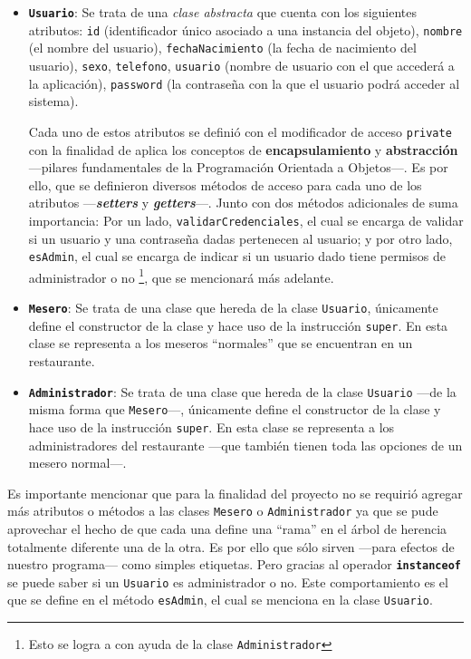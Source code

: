 \begin{itemize}
  \item \textbf{\texttt{Usuario}}: Se trata de una \textit{clase abstracta} 
  que cuenta con los siguientes atributos: \texttt{id} (identificador único 
    asociado a una instancia del objeto), \texttt{nombre} (el nombre del  
    usuario), \texttt{fechaNacimiento} (la fecha de nacimiento del usuario), 
    \texttt{sexo}, \texttt{telefono}, \texttt{usuario} (nombre de usuario con 
    el que accederá a la aplicación), \texttt{password} (la contraseña con la 
    que el usuario podrá acceder al sistema).

  Cada uno de estos atributos se definió con el modificador de acceso 
  \texttt{private} con la finalidad de aplica los conceptos de 
    \textbf{encapsulamiento} y \textbf{abstracción} ---pilares fundamentales 
    de la Programación Orientada a Objetos---. Es por ello, que se definieron 
    diversos métodos de acceso para cada uno de los atributos 
    ---\textbf{\textit{setters}} y \textbf{\textit{getters}}---. Junto con dos 
    métodos adicionales de suma importancia: Por un lado,  
    \texttt{validarCredenciales}, el cual se encarga de validar si un usuario  
    y una contraseña dadas pertenecen al usuario; y por otro lado, 
    \texttt{esAdmin}, el cual se encarga de indicar si un usuario dado tiene 
    permisos de administrador o no \footnote{Esto se logra a con ayuda de la 
    clase \texttt{Administrador}}, que se mencionará más adelante.

  \item \textbf{\texttt{Mesero}}: Se trata de una clase que hereda de la clase 
    \texttt{Usuario}, únicamente define el constructor de la clase y hace uso 
    de la instrucción \texttt{super}. En esta clase se representa a los 
    meseros ``normales'' que se encuentran en un restaurante.

  \item \textbf{\texttt{Administrador}}: Se trata de una clase que hereda de la clase 
    \texttt{Usuario} ---de la misma forma que \texttt{Mesero}---, únicamente 
    define el constructor de la clase y hace uso de la instrucción 
    \texttt{super}. En esta clase se representa a los administradores del 
    restaurante ---que también tienen toda las opciones de un mesero 
    normal---.
\end{itemize}

Es importante mencionar que para la finalidad del proyecto no se requirió 
agregar más atributos o métodos a las clases \texttt{Mesero} o 
\texttt{Administrador} ya que se pude aprovechar el hecho de que cada una 
define una ``rama'' en el árbol de herencia totalmente diferente una de la 
otra. Es por ello que sólo sirven ---para efectos de nuestro programa--- como 
simples etiquetas. Pero gracias al operador \texttt{\textbf{instanceof}} se 
puede saber si un \texttt{Usuario} es administrador o no. Este comportamiento 
es el que se define en el método \texttt{esAdmin}, el cual se menciona en la 
clase \texttt{Usuario}.

